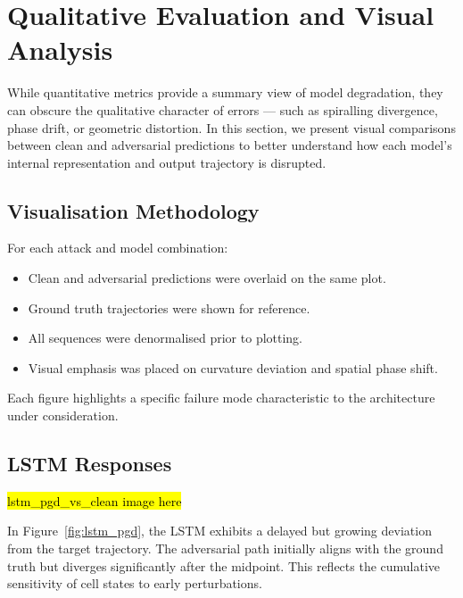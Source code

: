 \section{Qualitative Evaluation and Visual Analysis}

While quantitative metrics provide a summary view of model degradation, they can obscure the qualitative character of errors — such as spiralling divergence, phase drift, or geometric distortion. In this section, we present visual comparisons between clean and adversarial predictions to better understand how each model's internal representation and output trajectory is disrupted.

\subsection{Visualisation Methodology}

For each attack and model combination:
\begin{itemize}
    \item Clean and adversarial predictions were overlaid on the same plot.
    \item Ground truth trajectories were shown for reference.
    \item All sequences were denormalised prior to plotting.
    \item Visual emphasis was placed on curvature deviation and spatial phase shift.
\end{itemize}

Each figure highlights a specific failure mode characteristic to the architecture under consideration.

\subsection{LSTM Responses}

\hl{lstm\_pgd\_vs\_clean image here}


In Figure~\ref{fig:lstm_pgd}, the LSTM exhibits a delayed but growing deviation from the target trajectory. The adversarial path initially aligns with the ground truth but diverges significantly after the midpoint. This reflects the cumulative sensitivity of cell states to early perturbations.

